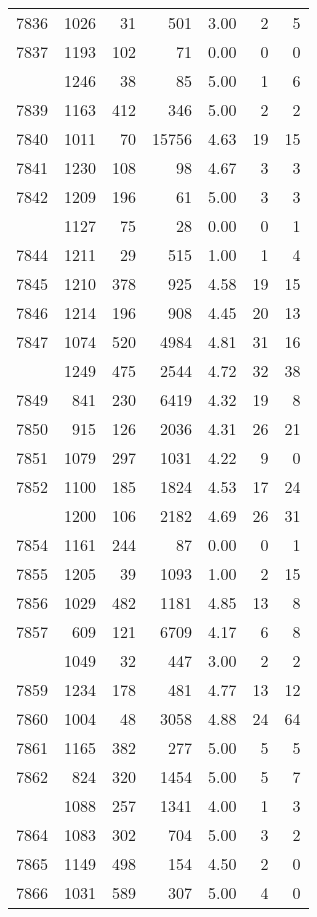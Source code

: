 \documentclass[
]{article}
\begin{document}
\begin{table}
\begin{tabular}[t]{lrrrrrr}
7836 & 1026 & 31 & 501 & 3.00 & 2 & 5\\
7837 & 1193 & 102 & 71 & 0.00 & 0 & 0\\
\addlinespace
7838 & 1246 & 38 & 85 & 5.00 & 1 & 6\\
7839 & 1163 & 412 & 346 & 5.00 & 2 & 2\\
7840 & 1011 & 70 & 15756 & 4.63 & 19 & 15\\
7841 & 1230 & 108 & 98 & 4.67 & 3 & 3\\
7842 & 1209 & 196 & 61 & 5.00 & 3 & 3\\
\addlinespace
7843 & 1127 & 75 & 28 & 0.00 & 0 & 1\\
7844 & 1211 & 29 & 515 & 1.00 & 1 & 4\\
7845 & 1210 & 378 & 925 & 4.58 & 19 & 15\\
7846 & 1214 & 196 & 908 & 4.45 & 20 & 13\\
7847 & 1074 & 520 & 4984 & 4.81 & 31 & 16\\
\addlinespace
7848 & 1249 & 475 & 2544 & 4.72 & 32 & 38\\
7849 & 841 & 230 & 6419 & 4.32 & 19 & 8\\
7850 & 915 & 126 & 2036 & 4.31 & 26 & 21\\
7851 & 1079 & 297 & 1031 & 4.22 & 9 & 0\\
7852 & 1100 & 185 & 1824 & 4.53 & 17 & 24\\
\addlinespace
7853 & 1200 & 106 & 2182 & 4.69 & 26 & 31\\
7854 & 1161 & 244 & 87 & 0.00 & 0 & 1\\
7855 & 1205 & 39 & 1093 & 1.00 & 2 & 15\\
7856 & 1029 & 482 & 1181 & 4.85 & 13 & 8\\
7857 & 609 & 121 & 6709 & 4.17 & 6 & 8\\
\addlinespace
7858 & 1049 & 32 & 447 & 3.00 & 2 & 2\\
7859 & 1234 & 178 & 481 & 4.77 & 13 & 12\\
7860 & 1004 & 48 & 3058 & 4.88 & 24 & 64\\
7861 & 1165 & 382 & 277 & 5.00 & 5 & 5\\
7862 & 824 & 320 & 1454 & 5.00 & 5 & 7\\
\addlinespace
7863 & 1088 & 257 & 1341 & 4.00 & 1 & 3\\
7864 & 1083 & 302 & 704 & 5.00 & 3 & 2\\
7865 & 1149 & 498 & 154 & 4.50 & 2 & 0\\
7866 & 1031 & 589 & 307 & 5.00 & 4 & 0\\

\end{tabular}
\end{table}
\end{document}
